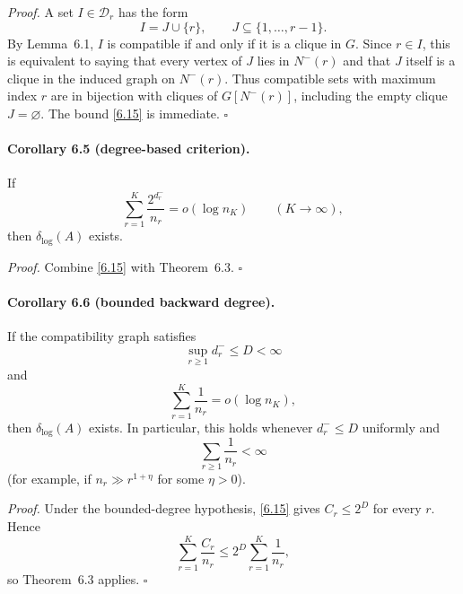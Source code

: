 \emph{Proof.}
A set $I\in\mathcal D_r$ has the form
\[
I=J\cup\{r\},\qquad J\subseteq\{1,\dots,r-1\}.
\]
By Lemma~6.1, $I$ is compatible if and only if it is a clique in $G$.  Since $r\in I$, this is equivalent to saying that every vertex of $J$ lies in $N^{-}(r)$ and that $J$ itself is a clique in the induced graph on $N^{-}(r)$.  Thus compatible sets with maximum index $r$ are in bijection with cliques of $G[N^{-}(r)]$, including the empty clique $J=\varnothing$.  The bound \eqref{6.15} is immediate.  \hfill $\square$

\paragraph{Corollary 6.5 (degree-based criterion).}
If
\begin{equation}
\sum_{r=1}^{K}\frac{2^{d_r^{-}}}{n_r}=o(\log n_K)\qquad(K\to\infty),
\tag{6.16}
\end{equation}
then $\delta_{\log}(A)$ exists.

\emph{Proof.}
Combine \eqref{6.15} with Theorem~6.3.  \hfill $\square$

\paragraph{Corollary 6.6 (bounded backward degree).}
If the compatibility graph satisfies
\[
\sup_{r\ge 1} d_r^{-}\le D<\infty
\]
and
\begin{equation}
\sum_{r=1}^{K}\frac1{n_r}=o(\log n_K),
\tag{6.17}
\end{equation}
then $\delta_{\log}(A)$ exists.  In particular, this holds whenever $d_r^{-}\le D$ uniformly and
\[
\sum_{r\ge 1}\frac1{n_r}<\infty
\]
(for example, if $n_r\gg r^{1+\eta}$ for some $\eta>0$).

\emph{Proof.}
Under the bounded-degree hypothesis, \eqref{6.15} gives $C_r\le 2^D$ for every $r$.  Hence
\[
\sum_{r=1}^{K}\frac{C_r}{n_r}
\le 2^D\sum_{r=1}^{K}\frac1{n_r},
\]
so Theorem~6.3 applies.  \hfill $\square$

